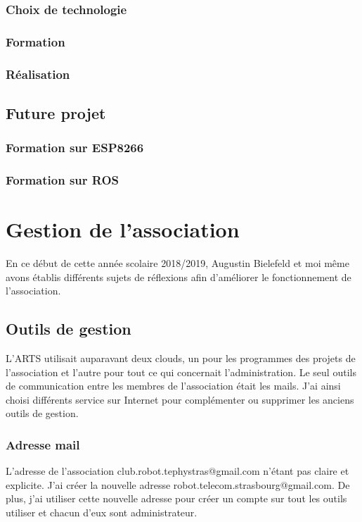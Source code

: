 \documentclass[12pt,a4paper]{report}
\begin{document}
    \subsection{Choix de technologie}
    \subsection{Formation}
    \subsection{Réalisation}
  \section{Future projet}
    \subsection{Formation sur ESP8266}
    \subsection{Formation sur ROS}

\chapter{Gestion de l'association}
  En ce début de cette année scolaire 2018/2019, Augustin Bielefeld et moi même avons établis différents sujets de réflexions afin d'améliorer le fonctionnement de l'association.

  \section{Outils de gestion}
    L'ARTS utilisait auparavant deux clouds, un pour les programmes des projets de l'association et l'autre pour tout ce qui concernait l'administration.
    Le seul outils de communication entre les membres de l'association était les mails.
    J'ai ainsi choisi différents service sur Internet pour complémenter ou supprimer les anciens outils de gestion.

    \subsection{Adresse mail}
      L'adresse de l'association club.robot.tephystras@gmail.com n'étant pas claire et explicite. J'ai créer la nouvelle adresse robot.telecom.strasbourg@gmail.com.
      De plus, j'ai utiliser cette nouvelle adresse pour créer un compte sur tout les outils utiliser et chacun d'eux sont administrateur.
\end{document}
